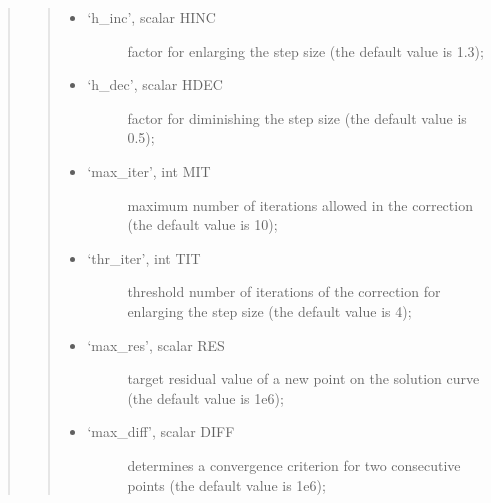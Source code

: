\documentclass[a4paper,11pt,english]{sphinxmanual}
\begin{document}
\begin{quote}
\begin{quote}
\begin{itemize}
\begin{description}
\end{description}

\item {} \begin{description}
\item[{‘h\_inc’, scalar HINC}] \leavevmode
\sphinxAtStartPar
factor for enlarging the step size (the default value is 1.3);

\end{description}

\item {} \begin{description}
\item[{‘h\_dec’, scalar HDEC}] \leavevmode
\sphinxAtStartPar
factor for diminishing the step size (the default value is 0.5);

\end{description}

\item {} \begin{description}
\item[{‘max\_iter’, int MIT}] \leavevmode
\sphinxAtStartPar
maximum number of iterations allowed in the correction (the default
value is 10);

\end{description}

\item {} \begin{description}
\item[{‘thr\_iter’, int TIT}] \leavevmode
\sphinxAtStartPar
threshold number of iterations of the correction for enlarging the
step size (the default value is 4);

\end{description}

\item {} \begin{description}
\item[{‘max\_res’, scalar RES}] \leavevmode
\sphinxAtStartPar
target residual value of a new point on the solution curve (the
default value is 1e\sphinxhyphen{}6);

\end{description}

\item {} \begin{description}
\item[{‘max\_diff’, scalar DIFF}] \leavevmode
\sphinxAtStartPar
determines a convergence criterion for two consecutive points (the
default value is 1e\sphinxhyphen{}6);


\end{description}
\end{itemize}
\end{quote}
\end{quote}
\end{document}
